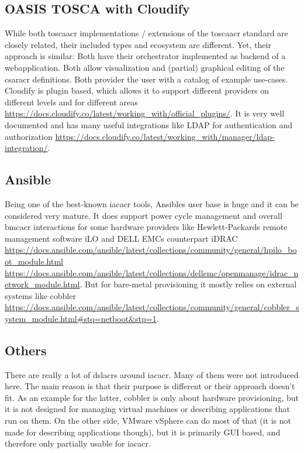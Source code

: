 \subsection{OASIS TOSCA with Cloudify}
While both \gls{toscaacr} implementations / extensions of the \gls{toscaacr} standard are closely related, their included types and ecosystem are different. Yet, their approach is similar: Both have their orchestrator implemented as backend of a webapplication. Both allow visualization and (partial) graphical editing of the \gls{csaracr} definitions. Both provider the user with a catalog of example use-cases.
\newline
Cloudify is plugin based, which allows it to support different providers on different levels and for different areas \url{https://docs.cloudify.co/latest/working_with/official_plugins/}. It is very well documented and has many useful integrations like LDAP for authentication and authorization \url{https://docs.cloudify.co/latest/working_with/manager/ldap-integration/}.

\subsection{Ansible}
Being one of the best-known \gls{iacacr} tools, Ansibles user base is huge and it can be considered very mature. It does support power cycle management and overall \gls{bmcacr} interactions for some hardware providers like Hewlett-Packards remote management software iLO and DELL EMCs counterpart iDRAC \url{https://docs.ansible.com/ansible/latest/collections/community/general/hpilo_boot_module.html} \url{https://docs.ansible.com/ansible/latest/collections/dellemc/openmanage/idrac_network_module.html}. But for  bare-metal provisioning it mostly relies on external systems like cobbler \url{https://docs.ansible.com/ansible/latest/collections/community/general/cobbler_system_module.html#stq=netboot&stp=1}.

\subsection{Others}
There are really a lot of \gls{dslacr}s around \gls{iacacr}. Many of them were not introduced here. The main reason is that their purpose is different or their approach doesn't fit. As an example for the latter, cobbler is only about hardware provisioning, but it is not designed for managing virtual machines or describing applications that run on them. On the other side, VMware vSphere can do most of that (it is not made for describing applications though), but it is primarily GUI based, and therefore only partially usable for \gls{iacacr}.

